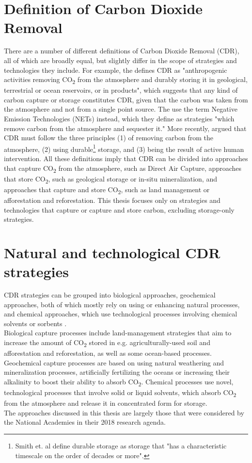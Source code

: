 \section{Definition of Carbon Dioxide Removal}
There are a number of different definitions of Carbon Dioxide Removal (CDR), all of which are broadly equal, but slightly differ in the scope of strategies and technologies they include. For example, the \textcite[544]{IPCC2018Global1.5C} defines CDR as "anthropogenic activities removing CO\textsubscript{2} from the atmosphere and durably storing it in geological, terrestrial or ocean reservoirs, or in products", which suggests that any kind of carbon capture or storage constitutes CDR, given that the carbon was taken from the atmosphere and not from a single point source. The \textcite[1]{NAS2018NegativeAgenda} use the term Negative Emission Technologies (NETs) instead, which they define as strategies "which remove carbon from the atmosphere and sequester it." More recently, \textcite{Smith2023TheEdition} argued that CDR must follow the three principles (1) of removing carbon from the atmosphere, (2) using durable\footnote{ Smith et. al define durable storage as storage that "has a characteristic timescale on the order of decades or more".} storage, and (3) being the result of active human intervention. All these definitions imply that CDR can be divided into approaches that capture CO\textsubscript{2} from the atmosphere, such as Direct Air Capture, approaches that store CO\textsubscript{2}, such as geological storage or in-situ mineralization, and approaches that capture and store CO\textsubscript{2}, such as land management or afforestation and reforestation. This thesis focuses only on strategies and technologies that capture or capture and store carbon, excluding storage-only strategies.
\section{Natural and technological CDR strategies}
CDR strategies can be grouped into biological approaches, geochemical approaches, both of which mostly rely on using or enhancing natural processes, and chemical approaches, which use technological processes involving chemical solvents or sorbents \parencite{Smith2023TheEdition}.\\
Biological capture processes include land-management strategies that aim to increase the amount of CO\textsubscript{2} stored in e.g. agriculturally-used soil and afforestation and reforestation, as well as some ocean-based processes.
Geochemical capture processes are based on using natural weathering and mineralization processes, artificially fertilizing the oceans or increasing their alkalinity to boost their ability to absorb CO\textsubscript{2}.
Chemical processes use novel, technological processes that involve solid or liquid solvents, which absorb CO\textsubscript{2} from the atmosphere and release it in concentrated form for storage.\\
The approaches discussed in this thesis are largely those that were considered by the National Academies in their 2018 research agenda.
